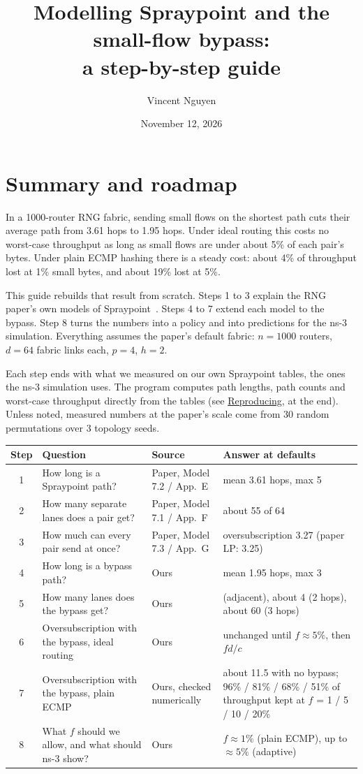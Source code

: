 \documentclass[11pt]{article}
\title{Modelling Spraypoint and the small-flow bypass:\\a step-by-step guide}
\author{Vincent Nguyen}
\date{November 12, 2026}
\newcommand{\file}[1]{\path{#1}}
\begin{document}
\maketitle

\section*{Summary and roadmap}

In a 1000-router RNG fabric, sending small flows on the shortest path cuts their average path from 3.61 hops to 1.95 hops. Under ideal routing this costs no worst-case throughput as long as small flows are under about 5\% of each pair's bytes. Under plain ECMP hashing there is a steady cost: about 4\% of throughput lost at 1\% small bytes, and about 19\% lost at 5\%.

This guide rebuilds that result from scratch. Steps 1 to 3 explain the RNG paper's own models of Spraypoint~\cite{rng}. Steps 4 to 7 extend each model to the bypass. Step 8 turns the numbers into a policy and into predictions for the ns-3 simulation. Everything assumes the paper's default fabric: $n = 1000$ routers, $d = 64$ fabric links each, $p = 4$, $h = 2$.

Each step ends with what we measured on our own Spraypoint tables, the ones the ns-3 simulation uses. The program \file{bypass-model} computes path lengths, path counts and worst-case throughput directly from the tables (see \hyperref[sec:reproducing]{Reproducing}, at the end). Unless noted, measured numbers at the paper's scale come from 30 random permutations over 3 topology seeds.

\begin{center}
\begin{tabularx}{\linewidth}{@{}c >{\hsize}L >{\hsize}L >{\hsize}L@{}}
\toprule
Step & Question & Source & Answer at defaults \\
 & How long is a Spraypoint path? & Paper, Model 7.2 / App.~E & mean 3.61 hops, max 5 \\
2 & How many separate lanes does a pair get? & Paper, Model 7.1 / App.~F & about 55 of 64 \\
3 & How much can every pair send at once? & Paper, Model 7.3 / App.~G & oversubscription 3.27 (paper LP: 3.25) \\
4 & How long is a bypass path? & Ours & mean 1.95 hops, max 3 \\
5 & How many lanes does the bypass get? & Ours & 1 (adjacent), about 4 (2 hops), about 60 (3 hops) \\
6 & Oversubscription with the bypass, ideal routing & Ours & unchanged until $f \approx 5\%$, then $f d / c$ \\
7 & Oversubscription with the bypass, plain ECMP & Ours, checked numerically & about 11.5 with no bypass; 96\% / 81\% / 68\% / 51\% of throughput kept at $f$ = 1 / 5 / 10 / 20\% \\
8 & What $f$ should we allow, and what should ns-3 show? & Ours & $f \approx 1\%$ (plain ECMP), up to $\approx 5\%$ (adaptive) \\
\bottomrule
\end{tabularx}
\end{center}
\end{document}
